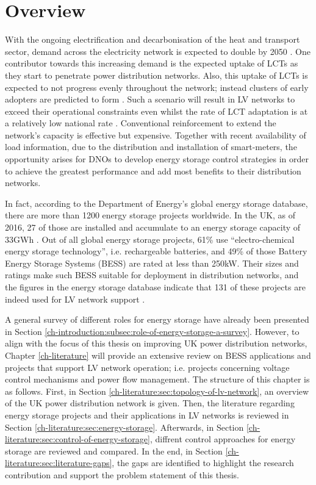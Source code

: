 \section{Overview}
\label{ch-literature:sec:overview}

With the ongoing electrification and decarbonisation of the heat and transport sector, demand across the electricity network is expected to double by 2050 \cite{Wilks2010}.
One contributor towards this increasing demand is the expected uptake of LCTs as they start to penetrate power distribution networks.
Also, this uptake of LCTs is expected to not progress evenly throughout the network; instead clusters of early adopters are predicted to form \cite{Poghosyan2014}.
Such a scenario will result in LV networks to exceed their operational constraints even whilst the rate of LCT adaptation is at a relatively low national rate \cite{Poghosyan2014}.
Conventional reinforcement to extend the network's capacity is effective but expensive.
Together with recent availability of load information, due to the distribution and installation of smart-meters, the opportunity arises for DNOs to develop energy storage control strategies in order to achieve the greatest performance and add most benefits to their distribution networks.

In fact, according to the Department of Energy's global energy storage database, there are more than 1200 energy storage projects worldwide.
In the UK, as of 2016, 27 of those are installed and accumulate to an energy storage capacity of 33GWh \cite{Garton2016}.
Out of all global energy storage projects, 61\% use ``electro-chemical energy storage technology'', i.e. rechargeable batteries, and 49\% of those Battery Energy Storage Systems (BESS) are rated at less than 250kW.
Their sizes and ratings make such BESS suitable for deployment in distribution networks, and the figures in the energy storage database indicate that 131 of these projects are indeed used for LV network support \cite{DOE-GESD}.

A general survey of different roles for energy storage have already been presented in Section \ref{ch-introduction:subsec:role-of-energy-storage-a-survey}.
However, to align with the focus of this thesis on improving UK power distribution networks, Chapter \ref{ch-literature} will provide an extensive review on BESS applications and projects that support LV network operation; i.e. projects concerning voltage control mechanisms and power flow management.
The structure of this chapter is as follows.
First, in Section \ref{ch-literature:sec:topology-of-lv-network}, an overview of the UK power distribution network is given.
Then, the literature regarding energy storage projects and their applications in LV networks is reviewed in Section \ref{ch-literature:sec:energy-storage}.
Afterwards, in Section \ref{ch-literature:sec:control-of-energy-storage}, diffrent control approaches for energy storage are reviewed and compared.
In the end, in Section \ref{ch-literature:sec:literature-gaps}, the gaps are identified to highlight the research contribution and support the problem statement of this thesis.
